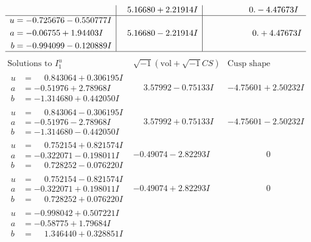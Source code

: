 \documentclass[1p]{elsarticle_modified}
\theoremstyle{definition}
\newcommand{\I}{\sqrt{-1}}
\begin{document}
$$\begin{array}{c|c|c}
 & \phantom{-}5.16680 + 2.21914 I & \phantom{-0.000000 } 0. - 4.47673 I \\ \hline\begin{aligned}
u &= -0.725676 - 0.550777 I \\
a &= -0.06755 + 1.94403 I \\
b &= -0.994099 - 0.120889 I\end{aligned}
 & \phantom{-}5.16680 - 2.21914 I & \phantom{-0.000000 -}0. + 4.47673 I\\
 \hline 
 \end{array}$$\newpage$$\begin{array}{c|c|c}  
\text{Solutions to }I^u_{1}& \I (\text{vol} + \sqrt{-1}CS) & \text{Cusp shape}\\
 \hline 
\begin{aligned}
u &= \phantom{-}0.843064 + 0.306195 I \\
a &= -0.51976 + 2.78968 I \\
b &= -1.314680 + 0.442050 I\end{aligned}
 & \phantom{-}3.57992 - 0.75133 I & -4.75601 + 2.50232 I \\ \hline\begin{aligned}
u &= \phantom{-}0.843064 - 0.306195 I \\
a &= -0.51976 - 2.78968 I \\
b &= -1.314680 - 0.442050 I\end{aligned}
 & \phantom{-}3.57992 + 0.75133 I & -4.75601 - 2.50232 I \\ \hline\begin{aligned}
u &= \phantom{-}0.752154 + 0.821574 I \\
a &= -0.322071 - 0.198011 I \\
b &= \phantom{-}0.728252 - 0.076220 I\end{aligned}
 & -0.49074 - 2.82293 I & \phantom{-0.000000 } 0 \\ \hline\begin{aligned}
u &= \phantom{-}0.752154 - 0.821574 I \\
a &= -0.322071 + 0.198011 I \\
b &= \phantom{-}0.728252 + 0.076220 I\end{aligned}
 & -0.49074 + 2.82293 I & \phantom{-0.000000 } 0 \\ \hline\begin{aligned}
u &= -0.998042 + 0.507221 I \\
a &= -0.58775 + 1.79684 I \\
b &= \phantom{-}1.346440 + 0.328851 I\end{aligned}

\end{array}$$
\end{document}

